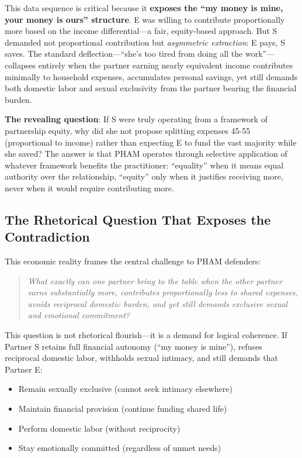 \documentclass[12pt,openany]{book}
\numberwithin{equation}{chapter}
\begin{document}
This data sequence is critical because it \textbf{exposes the ``my money is mine, your money is ours'' structure}. E was willing to contribute proportionally more based on the income differential---a fair, equity-based approach. But S demanded not proportional contribution but \textit{asymmetric extraction}: E pays, S saves. The standard deflection---``she's too tired from doing all the work''---collapses entirely when the partner earning nearly equivalent income contributes minimally to household expenses, accumulates personal savings, yet still demands both domestic labor and sexual exclusivity from the partner bearing the financial burden.

\textbf{The revealing question}: If S were truly operating from a framework of partnership equity, why did she not propose splitting expenses 45-55 (proportional to income) rather than expecting E to fund the vast majority while she saved? The answer is that PHAM operates through selective application of whatever framework benefits the practitioner: ``equality'' when it means equal authority over the relationship, ``equity'' only when it justifies receiving more, never when it would require contributing more.

\subsection{The Rhetorical Question That Exposes the Contradiction}

This economic reality frames the central challenge to PHAM defenders:

\begin{quote}
\textit{What exactly can one partner bring to the table when the other partner earns substantially more, contributes proportionally less to shared expenses, avoids reciprocal domestic burden, and yet still demands exclusive sexual and emotional commitment?}
\end{quote}

This question is not rhetorical flourish---it is a demand for logical coherence. If Partner S retains full financial autonomy (``my money is mine''), refuses reciprocal domestic labor, withholds sexual intimacy, and still demands that Partner E:

\begin{itemize}
    \item Remain sexually exclusive (cannot seek intimacy elsewhere)
    \item Maintain financial provision (continue funding shared life)
    \item Perform domestic labor (without reciprocity)
    \item Stay emotionally committed (regardless of unmet needs)
\end{itemize}
\end{document}
